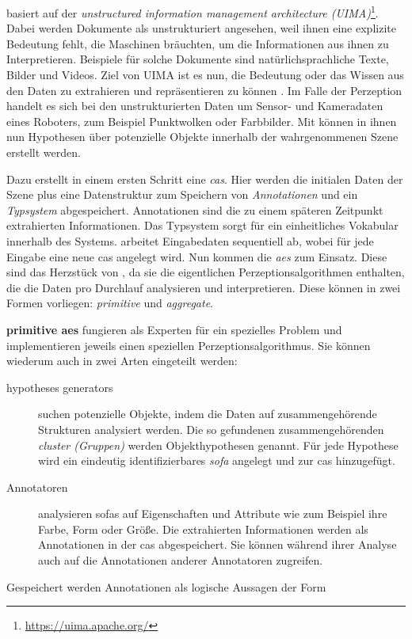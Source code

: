 \robosherlock basiert auf der \textit{unstructured information management architecture (UIMA)}\footnote{\url{https://uima.apache.org/}}. Dabei werden Dokumente als unstrukturiert angesehen, weil ihnen eine explizite Bedeutung fehlt, die Maschinen bräuchten, um die Informationen aus ihnen zu Interpretieren. Beispiele für solche Dokumente sind natürlichsprachliche Texte, Bilder und Videos. Ziel von UIMA ist es nun, die Bedeutung oder das Wissen aus den Daten zu extrahieren und repräsentieren zu können \cite{UIMA}. Im Falle der Perzeption handelt es sich bei den unstrukturierten Daten um Sensor- und Kameradaten eines Roboters, zum Beispiel Punktwolken oder Farbbilder. Mit \robosherlock können in ihnen nun Hypothesen über potenzielle Objekte innerhalb der wahrgenommenen Szene erstellt werden. \par
Dazu erstellt \robosherlock in einem ersten Schritt eine \textit{\gls{cas}}. Hier werden die initialen Daten der Szene plus eine Datenstruktur zum Speichern von \textit{Annotationen} und ein \textit{Typsystem} abgespeichert. Annotationen sind die zu einem späteren Zeitpunkt extrahierten Informationen. Das Typsystem sorgt für ein einheitliches Vokabular innerhalb des Systems. \robosherlock arbeitet Eingabedaten sequentiell ab, wobei für jede Eingabe eine neue \gls{cas} angelegt wird. \newline
Nun kommen die \textit{\glspl{ae}} zum Einsatz. Diese sind das Herzstück von \robosherlock, da sie die eigentlichen Perzeptionsalgorithmen enthalten, die die Daten pro Durchlauf analysieren und interpretieren. Diese können in zwei Formen vorliegen: \textit{primitive} und \textit{aggregate}. \par
\textbf{primitive \glspl{ae}} fungieren als Experten für ein spezielles Problem und implementieren jeweils einen speziellen Perzeptionsalgorithmus. Sie können wiederum auch in zwei Arten eingeteilt werden:
\begin{description}
\item[hypotheses generators] suchen potenzielle Objekte, indem die Daten auf zusammengehörende Strukturen analysiert werden. Die so gefundenen zusammengehörenden \textit{cluster (Gruppen)} werden Objekthypothesen genannt. Für jede Hypothese wird ein eindeutig identifizierbares \textit{\gls{sofa}} angelegt und zur \gls{cas} hinzugefügt.
\item[Annotatoren] analysieren \glspl{sofa} auf Eigenschaften und Attribute wie zum Beispiel ihre Farbe, Form oder Größe. Die extrahierten Informationen werden als Annotationen in der \gls{cas} abgespeichert. Sie können während ihrer Analyse auch auf die Annotationen anderer Annotatoren zugreifen.\end{description} Gespeichert werden Annotationen als logische Aussagen der Form 
